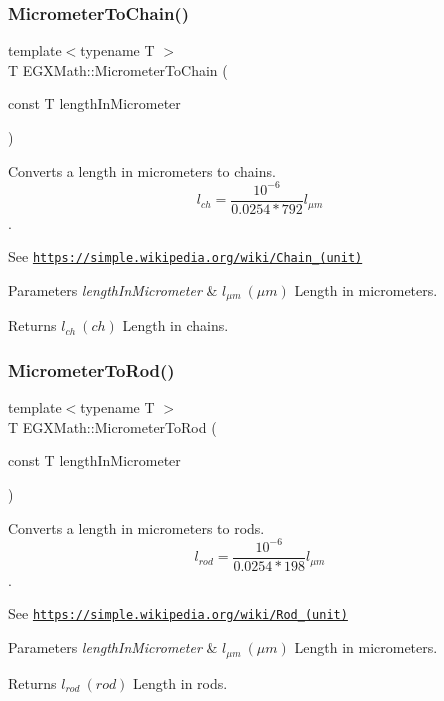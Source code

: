 \subsubsection{\texorpdfstring{Micrometer\+To\+Chain()}{MicrometerToChain()}}
{\footnotesize\ttfamily template$<$typename T $>$ \\
T E\+G\+X\+Math\+::\+Micrometer\+To\+Chain (\begin{DoxyParamCaption}\item[{const T}]{length\+In\+Micrometer }\end{DoxyParamCaption})}



Converts a length in micrometers to chains. \[ l_{ch}= \frac{10^{-6}}{0.0254 * 792} l_{\mu m} \]. 

See \href{https://simple.wikipedia.org/wiki/Chain_(unit)}{\tt https\+://simple.\+wikipedia.\+org/wiki/\+Chain\+\_\+(unit)} 
\begin{DoxyParams}{Parameters}
{\em length\+In\+Micrometer} & $ l_{\mu m}\ (\mu m)$ Length in micrometers. \\
\hline
\end{DoxyParams}
\begin{DoxyReturn}{Returns}
$ l_{ch}\ (ch)$ Length in chains. 
\end{DoxyReturn}
\mbox{\label{group___e_g_x_math-_conversions-_length_conversions-_s_i-_micrometer-_surveyors_ga86e147ebc58116be9c15a873451ac156}} 
\subsubsection{\texorpdfstring{Micrometer\+To\+Rod()}{MicrometerToRod()}}
{\footnotesize\ttfamily template$<$typename T $>$ \\
T E\+G\+X\+Math\+::\+Micrometer\+To\+Rod (\begin{DoxyParamCaption}\item[{const T}]{length\+In\+Micrometer }\end{DoxyParamCaption})}



Converts a length in micrometers to rods. \[ l_{rod}= \frac{10^{-6}}{0.0254 * 198} l_{\mu m} \]. 

See \href{https://simple.wikipedia.org/wiki/Rod_(unit)}{\tt https\+://simple.\+wikipedia.\+org/wiki/\+Rod\+\_\+(unit)} 
\begin{DoxyParams}{Parameters}
{\em length\+In\+Micrometer} & $ l_{\mu m}\ (\mu m)$ Length in micrometers. \\
\hline
\end{DoxyParams}
\begin{DoxyReturn}{Returns}
$ l_{rod}\ (rod)$ Length in rods. 
\end{DoxyReturn}
